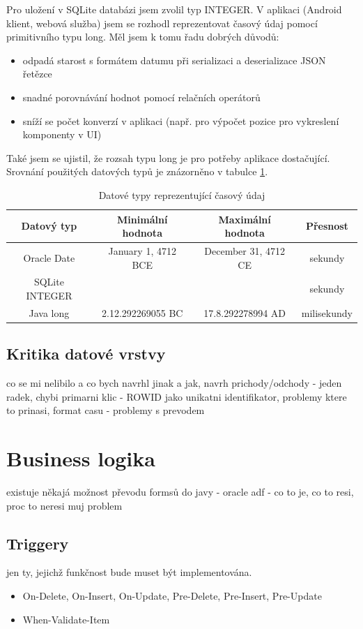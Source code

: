 \documentclass{bakalarka}
\begin{document}
\noindent
Pro uložení v SQLite databázi jsem zvolil typ INTEGER. V aplikaci (Android klient, webová služba) jsem se rozhodl reprezentovat časový údaj pomocí primitivního typu long. Měl jsem k tomu řadu dobrých důvodů:
\begin{itemize}
\item odpadá starost s formátem datumu při serializaci a deserializace JSON řetězce
\item snadné porovnávání hodnot pomocí relačních operátorů
\item sníží se počet konverzí v aplikaci (např. pro výpočet pozice pro vykreslení komponenty v UI)
\end{itemize}

Také jsem se ujistil, že rozsah typu long je pro potřeby aplikace dostačující. Srovnání použitých datových typů je znázorněno v tabulce \ref{tab:cas}. 

\begin{table}[H]
\centering
\begin{tabular}{| c | c | c | c |}
\hline
Datový typ &  Minimální hodnota & Maximální hodnota & Přesnost \\ \hline
Oracle Date &   January 1, 4712 BCE  &  December 31, 4712 CE &  sekundy \\ \hline
SQLite INTEGER &    &  &  sekundy \\ \hline
Java long & 2.12.292269055 BC   & 17.8.292278994 AD &  milisekundy \\ \hline
\end{tabular}
\caption{Datové typy reprezentující časový údaj}
\label{tab:cas}
\end{table}

\subsection{Kritika datové vrstvy}
co se mi nelibilo a co bych navrhl jinak a jak, navrh prichody/odchody - jeden radek,
chybi primarni klic - ROWID jako unikatni identifikator, problemy ktere to prinasi,
format casu - problemy s prevodem

\section{Business logika}
existuje někajá možnost převodu formsů do javy - oracle adf - co to je, co to resi, proc to neresi muj problem
\subsection{Triggery}
jen ty, jejichž funkčnost bude muset být implementována.
\begin{itemize}
\item On-Delete, On-Insert, On-Update, Pre-Delete, Pre-Insert, Pre-Update
\item When-Validate-Item
\end{itemize}
\end{document}
